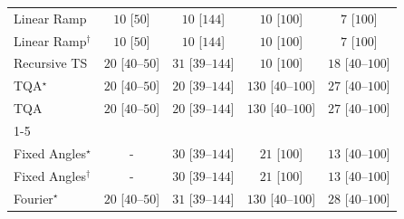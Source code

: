\begin{tabular}{l|cccc|}
Linear Ramp & {\cellcolor[HTML]{F7FCF5}} \color[HTML]{000000} $10$ [$50$] & {\cellcolor[HTML]{F7FCF5}} \color[HTML]{000000} $10$ [$144$] & {\cellcolor[HTML]{F7FCF5}} \color[HTML]{000000} $10$ [$100$] & {\cellcolor[HTML]{F7FCF5}} \color[HTML]{000000} $7$ [$100$] \\
Linear Ramp$^\dagger$ & {\cellcolor[HTML]{F7FCF5}} \color[HTML]{000000} $10$ [$50$] & {\cellcolor[HTML]{F7FCF5}} \color[HTML]{000000} $10$ [$144$] & {\cellcolor[HTML]{F7FCF5}} \color[HTML]{000000} $10$ [$100$] & {\cellcolor[HTML]{F7FCF5}} \color[HTML]{000000} $7$ [$100$] \\
Recursive TS & {\cellcolor[HTML]{F5FBF2}} \color[HTML]{000000} $20$ [$40$--$50$] & {\cellcolor[HTML]{F3FAF0}} \color[HTML]{000000} $31$ [$39$--$144$] & {\cellcolor[HTML]{F7FCF5}} \color[HTML]{000000} $10$ [$100$] & {\cellcolor[HTML]{F5FBF3}} \color[HTML]{000000} $18$ [$40$--$100$] \\
TQA$^\star$ & {\cellcolor[HTML]{F5FBF2}} \color[HTML]{000000} $20$ [$40$--$50$] & {\cellcolor[HTML]{F5FBF2}} \color[HTML]{000000} $20$ [$39$--$144$] & {\cellcolor[HTML]{DFF3DA}} \color[HTML]{000000} $130$ [$40$--$100$] & {\cellcolor[HTML]{F4FBF1}} \color[HTML]{000000} $27$ [$40$--$100$] \\
TQA & {\cellcolor[HTML]{F5FBF2}} \color[HTML]{000000} $20$ [$40$--$50$] & {\cellcolor[HTML]{F5FBF2}} \color[HTML]{000000} $20$ [$39$--$144$] & {\cellcolor[HTML]{DFF3DA}} \color[HTML]{000000} $130$ [$40$--$100$] & {\cellcolor[HTML]{F4FBF1}} \color[HTML]{000000} $27$ [$40$--$100$] \\
\cline{1-5}
\multicolumn{5}{c}{\rule{0pt}{8pt}PP} \\
\midrule
Fixed Angles$^\star$ & {\cellcolor[HTML]{000000}} \color[HTML]{F1F1F1} {\cellcolor{white}} \color{black} - & {\cellcolor[HTML]{F3FAF0}} \color[HTML]{000000} $30$ [$39$--$144$] & {\cellcolor[HTML]{F5FBF2}} \color[HTML]{000000} $21$ [$100$] & {\cellcolor[HTML]{F6FCF4}} \color[HTML]{000000} $13$ [$40$--$100$] \\
Fixed Angles$^\dagger$ & {\cellcolor[HTML]{000000}} \color[HTML]{F1F1F1} {\cellcolor{white}} \color{black} - & {\cellcolor[HTML]{F3FAF0}} \color[HTML]{000000} $30$ [$39$--$144$] & {\cellcolor[HTML]{F5FBF2}} \color[HTML]{000000} $21$ [$100$] & {\cellcolor[HTML]{F6FCF4}} \color[HTML]{000000} $13$ [$40$--$100$] \\
Fourier$^\star$ & {\cellcolor[HTML]{F5FBF2}} \color[HTML]{000000} $20$ [$40$--$50$] & {\cellcolor[HTML]{F3FAF0}} \color[HTML]{000000} $31$ [$39$--$144$] & {\cellcolor[HTML]{DFF3DA}} \color[HTML]{000000} $130$ [$40$--$100$] & {\cellcolor[HTML]{F4FBF1}} \color[HTML]{000000} $28$ [$40$--$100$] \\

\end{tabular}
